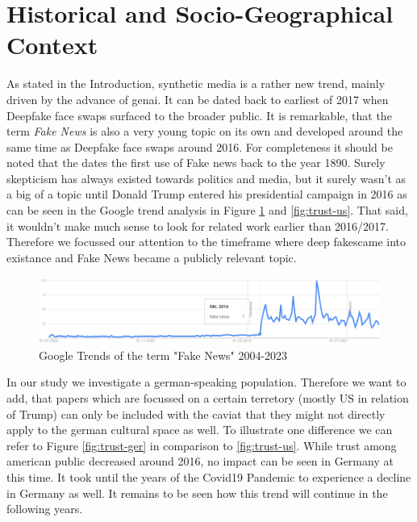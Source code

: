 \documentclass[
  a4paper,  %
  twoside,  %
  bibliography=totoc,
  headsepline,
  cleardoublepage=empty,
  parskip=half,
  draft=false
]{scrbook}
\begin{document}
\section{Historical and Socio-Geographical Context}
\label{sec:hist-context}
As stated in the Introduction, synthetic media is a rather new trend, mainly driven by the advance of \gls{genai}. It can be dated back to earliest of 2017 when Deepfake face swaps surfaced to the broader public. It is remarkable, that the term \textit{Fake News} is also a very young topic on its own and developed around the same time as Deepfake face swaps around 2016. For completeness it should be noted that the \citet{merriam-websterdictionaryRealStoryFake} dates the first use of Fake news back to the year 1890. Surely skepticism has always existed towards politics and media, but it surely wasn't as a big of a topic until Donald Trump entered his presidential campaign in 2016 as can be seen in the Google trend analysis in Figure \ref{fig:gtrend-fake-news} and \ref{fig:trust-us}. That said, it wouldn't make much sense to look for related work earlier than 2016/2017. Therefore we focussed our attention to the timeframe where deep fakescame into existance and Fake News became a publicly relevant topic.
\begin{figure}[h]
  \centering
  \includegraphics[width=1\textwidth]{./graphics/images/gtrends_fakenews_1011-2311.png}
  \caption{Google Trends of the term "Fake News" 2004-2023}
  \label{fig:gtrend-fake-news}
\end{figure}
In our study we investigate a german-speaking population. Therefore we want to add, that papers which are focussed on a certain terretory (mostly US in relation of Trump) can only be included with the caviat that they might not directly apply to the german cultural space as well. To illustrate one difference we can refer to Figure \ref{fig:trust-ger} in comparison to \ref{fig:trust-us}. While trust among american public decreased around 2016, no impact can be seen in Germany at this time. It took until the years of the Covid19 Pandemic to experience a decline in Germany as well. It remains to be seen how this trend will continue in the following years.
\end{document}
